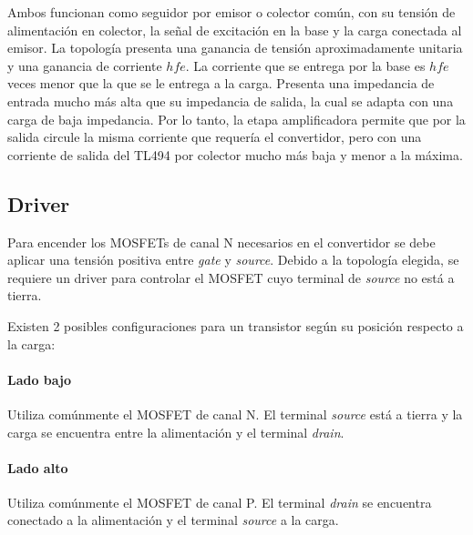 Ambos funcionan como seguidor por emisor o colector común, con su tensión de alimentación en colector, la señal de excitación en la base y la carga conectada al emisor. 
La topología presenta una ganancia de tensión aproximadamente unitaria y una ganancia de corriente $hfe$. 
La corriente que se entrega por la base es $hfe$ veces menor que la que se le entrega a la carga. 
Presenta una impedancia de entrada mucho más alta que su impedancia de salida, la cual se adapta con una carga de baja impedancia. 
Por lo tanto, la etapa amplificadora permite que por la salida circule la misma corriente que requería el convertidor, pero con una corriente de salida del TL494 por colector mucho más baja y menor a la máxima. 

\subsection{Driver}

Para encender los MOSFETs de canal N necesarios en el convertidor se debe aplicar una tensión positiva entre \textit{gate} y \textit{source}. 
Debido a la topología elegida, se requiere un driver para controlar el MOSFET cuyo terminal de \textit{source} no está a tierra.

Existen 2 posibles configuraciones para un transistor según su posición respecto a la carga:

\paragraph{Lado bajo} Utiliza comúnmente el MOSFET de canal N. 
El terminal \textit{source} está a tierra y la carga se encuentra entre la alimentación y el terminal \textit{drain}. 

\paragraph{Lado alto} Utiliza comúnmente el MOSFET de canal P. 
El terminal \textit{drain} se encuentra conectado a la alimentación y el terminal \textit{source} a la carga.\\

